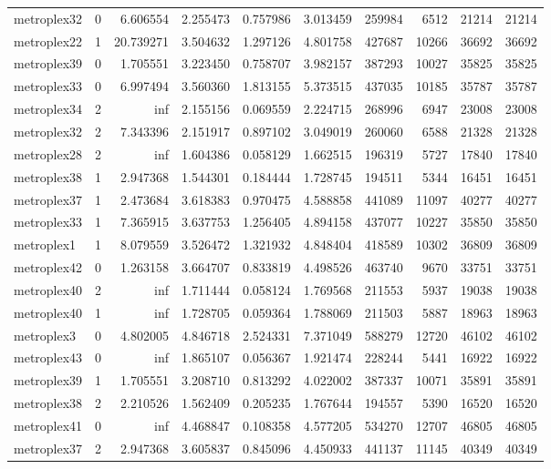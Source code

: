 \begin{longtable}{|l|r|r|r|r|r|r|r|r|r|}
metroplex32 & 0 & 6.606554 & 2.255473 & 0.757986 & 3.013459 & 259984 & 6512 & 21214 & 21214 \\
metroplex22 & 1 & 20.739271 & 3.504632 & 1.297126 & 4.801758 & 427687 & 10266 & 36692 & 36692 \\
metroplex39 & 0 & 1.705551 & 3.223450 & 0.758707 & 3.982157 & 387293 & 10027 & 35825 & 35825 \\
metroplex33 & 0 & 6.997494 & 3.560360 & 1.813155 & 5.373515 & 437035 & 10185 & 35787 & 35787 \\
metroplex34 & 2 & inf & 2.155156 & 0.069559 & 2.224715 & 268996 & 6947 & 23008 & 23008 \\
metroplex32 & 2 & 7.343396 & 2.151917 & 0.897102 & 3.049019 & 260060 & 6588 & 21328 & 21328 \\
metroplex28 & 2 & inf & 1.604386 & 0.058129 & 1.662515 & 196319 & 5727 & 17840 & 17840 \\
metroplex38 & 1 & 2.947368 & 1.544301 & 0.184444 & 1.728745 & 194511 & 5344 & 16451 & 16451 \\
metroplex37 & 1 & 2.473684 & 3.618383 & 0.970475 & 4.588858 & 441089 & 11097 & 40277 & 40277 \\
metroplex33 & 1 & 7.365915 & 3.637753 & 1.256405 & 4.894158 & 437077 & 10227 & 35850 & 35850 \\
metroplex1 & 1 & 8.079559 & 3.526472 & 1.321932 & 4.848404 & 418589 & 10302 & 36809 & 36809 \\
metroplex42 & 0 & 1.263158 & 3.664707 & 0.833819 & 4.498526 & 463740 & 9670 & 33751 & 33751 \\
metroplex40 & 2 & inf & 1.711444 & 0.058124 & 1.769568 & 211553 & 5937 & 19038 & 19038 \\
metroplex40 & 1 & inf & 1.728705 & 0.059364 & 1.788069 & 211503 & 5887 & 18963 & 18963 \\
metroplex3 & 0 & 4.802005 & 4.846718 & 2.524331 & 7.371049 & 588279 & 12720 & 46102 & 46102 \\
metroplex43 & 0 & inf & 1.865107 & 0.056367 & 1.921474 & 228244 & 5441 & 16922 & 16922 \\
metroplex39 & 1 & 1.705551 & 3.208710 & 0.813292 & 4.022002 & 387337 & 10071 & 35891 & 35891 \\
metroplex38 & 2 & 2.210526 & 1.562409 & 0.205235 & 1.767644 & 194557 & 5390 & 16520 & 16520 \\
metroplex41 & 0 & inf & 4.468847 & 0.108358 & 4.577205 & 534270 & 12707 & 46805 & 46805 \\
metroplex37 & 2 & 2.947368 & 3.605837 & 0.845096 & 4.450933 & 441137 & 11145 & 40349 & 40349 \\

\end{longtable}
